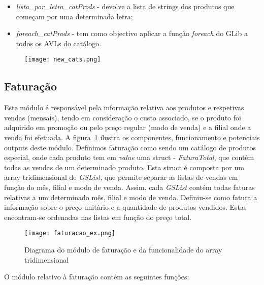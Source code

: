 \documentclass{article}
\begin{document}
\begin{itemize}
\item \textit{lista\_por\_letra\_catProds} - devolve a lista de strings dos produtos que começam por uma determinada letra;
\item\textit{foreach\_catProds} - tem como objectivo aplicar a função \textit{foreach} do GLib a todos os AVLs do catálogo.
\end{itemize}

\begin{figure}[H]
\centering
\texttt{[image: new\_cats.png]}
\end{figure}

\subsection{Faturação}\label{sub:fat}

Este módulo é responsável pela informação relativa aos produtos e respetivas vendas (mensais), tendo em consideração o custo associado, se o produto foi adquirido em promoção ou pelo preço regular (modo de venda) e a filial onde a venda foi efetuada. A figura~\ref{fig:fat_dia} ilustra os componentes,  funcionamento e potenciais outputs deste módulo. 
Definimos faturação como sendo um catálogo de produtos especial, onde cada produto tem em \textit{value} uma struct - \textit{FaturaTotal}, que contém todas as vendas de um determinado produto.  
Esta struct é composta por um array tridimensional de \textit{GSList}, que permite separar as listas de vendas em função do mês, filial e modo de venda. Assim, cada \textit{GSList} contém todas faturas relativas a um determinado mês, filial e modo de venda.   
Definiu-se como fatura a informação sobre o preço unitário e a quantidade de produtos vendidos. Estas encontram-se ordenadas nas listas em função do preço total. 

\begin{figure}[H]
\texttt{[image: faturacao\_ex.png]}
\centering
\caption{Diagrama do módulo de faturação e da funcionalidade do array tridimensional\label{fig:fat_dia}}
\end{figure}

O módulo relativo à faturação contém as seguintes funções:
\end{document}

